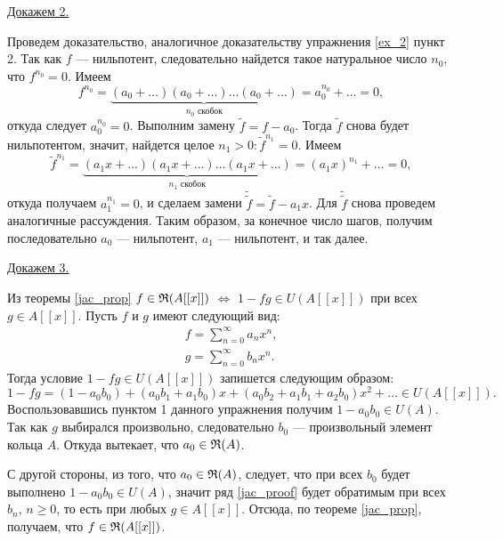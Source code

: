     \underline{Докажем 2.}
    \begin{Proof}
        
        Проведем доказательство, аналогичное доказательству упражнения \ref{ex_2} пункт 2. Так как $f$ --- нильпотент, следовательно найдется такое 
        натуральное число $n_0$, что $f^{n_0} = 0$. Имеем 
        $$
            f^{n_0} = \underbrace{(a_0 + \dots )(a_0 + \dots )\dots (a_0 + \dots )}_{n_0 \text{ скобок}} = a_0^{n_0} + \dots = 0,
        $$
        откуда следует $a_0^{n_0} = 0$. Выполним замену $\tilde{f} = f - a_0$. Тогда $\tilde{f}$ снова будет нильпотентом, значит, найдется целое $n_1 > 0 : \tilde{f}^{n_1} = 0$. Имеем
        $$
            \tilde{f}^{n_1} = \underbrace{(a_1x + \dots )(a_1x + \dots )\dots (a_1x + \dots )}_{n_1 \text{ скобок}} = (a_1x)^{n_1} + \dots = 0,
        $$
        откуда получаем $a_1^{n_1} = 0$, и сделаем замени $\tilde{\tilde{f}} = \tilde{f} - a_1x$. Для $\tilde{\tilde{f}}$ снова проведем аналогичные рассуждения. 
        Таким образом, за конечное число шагов, получим последовательно $a_0$ --- нильпотент, $a_1$ --- нильпотент, и так далее.
    \end{Proof}
    \underline{Докажем 3.}
    \begin{Proof}

        Из теоремы \ref{jac_prop} $f \in \mathfrak{R}(A[[x]])$ $\Leftrightarrow$ $1 - fg \in U(A[[x]])$ при всех $g \in A[[x]]$. Пусть $f$ и $g$ имеют следующий вид:
        \begin{align*}
            f = \sum_{n=0}^\infty a_nx^n,\\
            g = \sum_{n=0}^\infty b_nx^n.
        \end{align*}
        Тогда условие $1 - fg \in U(A[[x]])$ запишется следующим образом:
        \begin{equation} \label{jac_proof}
            1 - fg = (1 - a_0b_0) + (a_0b_1 + a_1b_0)x + (a_0b_2 + a_1b_1 + a_2b_0)x^2 + \dots \in U(A[[x]]).
        \end{equation}
        Воспользовавшись пунктом 1 данного упражнения получим $1 - a_0b_0 \in U(A)$. Так как $g$ выбирался произвольно, следовательно $b_0$ --- произвольный элемент кольца $A$.
        Откуда вытекает, что $a_0 \in \mathfrak{R}(A)$.

        С другой стороны, из того, что $a_0 \in \mathfrak{R}(A)$, следует, что при всех $b_0$ будет выполнено $1 - a_0b_0 \in U(A)$, значит ряд \eqref{jac_proof} 
        будет обратимым при всех $b_n$, $n \geqslant 0$, то есть при любых $g \in A[[x]]$. Отсюда, по теореме \ref{jac_prop}, получаем, что $f \in \mathfrak{R}(A[[x]])$.
    \end{Proof}
